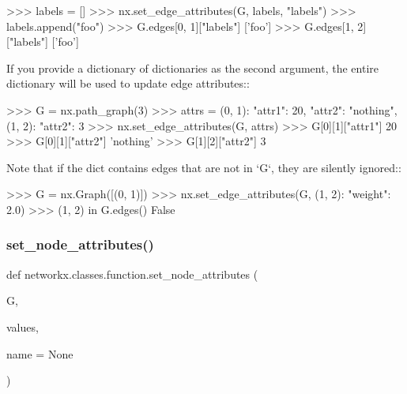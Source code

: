 \begin{DoxyVerb}
    >>> labels = []
    >>> nx.set_edge_attributes(G, labels, "labels")
    >>> labels.append("foo")
    >>> G.edges[0, 1]["labels"]
    ['foo']
    >>> G.edges[1, 2]["labels"]
    ['foo']

If you provide a dictionary of dictionaries as the second argument,
the entire dictionary will be used to update edge attributes::

    >>> G = nx.path_graph(3)
    >>> attrs = {(0, 1): {"attr1": 20, "attr2": "nothing"}, (1, 2): {"attr2": 3}}
    >>> nx.set_edge_attributes(G, attrs)
    >>> G[0][1]["attr1"]
    20
    >>> G[0][1]["attr2"]
    'nothing'
    >>> G[1][2]["attr2"]
    3

Note that if the dict contains edges that are not in `G`, they are
silently ignored::

    >>> G = nx.Graph([(0, 1)])
    >>> nx.set_edge_attributes(G, {(1, 2): {"weight": 2.0}})
    >>> (1, 2) in G.edges()
    False\end{DoxyVerb}
 \mbox{\label{namespacenetworkx_1_1classes_1_1function_acfa227e0002def739138e08480a98799}} 
\subsubsection{\texorpdfstring{set\+\_\+node\+\_\+attributes()}{set\_node\_attributes()}}
{\footnotesize\ttfamily def networkx.\+classes.\+function.\+set\+\_\+node\+\_\+attributes (\begin{DoxyParamCaption}\item[{}]{G,  }\item[{}]{values,  }\item[{}]{name = {\ttfamily None} }\end{DoxyParamCaption})}

